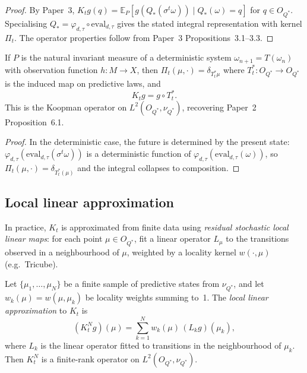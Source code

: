 \begin{proof}
By Paper~3, $K_t g(q) = \mathbb{E}_P[g(Q_*(\sigma^t\omega)) \mid Q_*(\omega) = q]$
for $q \in O_{Q^*}$.  Specialising $Q_* = \varphi_{d,\tau} \circ
\mathrm{eval}_{d,\tau}$ gives the stated integral representation with
kernel $\Pi_t$.  The operator properties follow from Paper~3
Propositions~3.1--3.3.
\end{proof}

\begin{proposition}\label{prop:koopman}
If $P$ is the natural invariant measure of a deterministic system
$\omega_{n+1} = T(\omega_n)$ with observation function $h : M \to X$,
then $\Pi_t(\mu, \cdot) = \delta_{T_t^*\mu}$ where $T_t^* : O_{Q^*} \to
O_{Q^*}$ is the induced map on predictive laws, and
\[
  K_t g = g \circ T_t^*.
\]
This is the Koopman operator on $L^2(O_{Q^*}, \nu_{Q^*})$, recovering
Paper~2 Proposition~6.1.
\end{proposition}

\begin{proof}
In the deterministic case, the future is determined by the present state:
$\varphi_{d,\tau}(\mathrm{eval}_{d,\tau}(\sigma^t\omega))$ is a
deterministic function of $\varphi_{d,\tau}(\mathrm{eval}_{d,\tau}(\omega))$,
so $\Pi_t(\mu,\cdot) = \delta_{T_t^*(\mu)}$ and the integral collapses
to composition.
\end{proof}

\subsection*{Local linear approximation}

In practice, $K_t$ is approximated from finite data using
\emph{residual stochastic local linear maps}: for each point
$\mu \in O_{Q^*}$, fit a linear operator $L_\mu$ to the transitions
observed in a neighbourhood of $\mu$, weighted by a locality kernel
$w(\cdot, \mu)$ (e.g.\ Tricube).

\begin{proposition}
\label{prop:local-linear}
Let $\{\mu_1, \ldots, \mu_N\}$ be a finite sample of predictive states
from $\nu_{Q^*}$, and let $w_k(\mu) = w(\mu, \mu_k)$ be locality weights
summing to~1.  The \emph{local linear approximation} to $K_t$ is
\[
  (K_t^N g)(\mu) = \sum_{k=1}^N w_k(\mu)\, (L_k g)(\mu_k),
\]
where $L_k$ is the linear operator fitted to transitions in the
neighbourhood of $\mu_k$.  Then $K_t^N$ is a finite-rank operator on
$L^2(O_{Q^*}, \nu_{Q^*})$.
\end{proposition}

